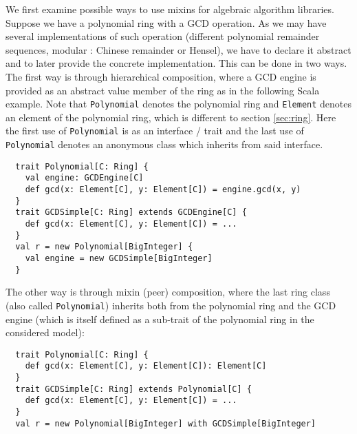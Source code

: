 \documentclass{llncs}
\newcommand{\code}[1]{\texttt{#1}}
\begin{document}
We first examine possible ways to use mixins for algebraic algorithm
libraries. Suppose we have a polynomial ring with a GCD operation. As
we may have several implementations of such operation (different
polynomial remainder sequences, modular : Chinese remainder or
Hensel), we have to declare it abstract and to later provide the
concrete implementation. This can be done in two ways. The first way
is through hierarchical composition, where a GCD engine is provided as
an abstract value member of the ring as in the following Scala
example. Note that \code{Polynomial} denotes the polynomial ring and
\code{Element} denotes an element of the polynomial ring, which is
different to section \ref{sec:ring}.
Here the first use of \code{Poly\-nomial} is as an interface / trait
and the last use of \code{Poly\-nomial} denotes an anonymous class
which inherits from said interface.
%
\begin{verbatim}
  trait Polynomial[C: Ring] {
    val engine: GCDEngine[C]
    def gcd(x: Element[C], y: Element[C]) = engine.gcd(x, y)
  }
  trait GCDSimple[C: Ring] extends GCDEngine[C] {
    def gcd(x: Element[C], y: Element[C]) = ...
  }
  val r = new Polynomial[BigInteger] {
    val engine = new GCDSimple[BigInteger]
  }
\end{verbatim}
%
The other way is through mixin (peer) composition, where the last
ring class (also called \code{Polynomial}) inherits both from the
polynomial ring and the GCD engine (which is itself defined as a
sub-trait of the polynomial ring in the considered model):
\begin{verbatim}
  trait Polynomial[C: Ring] {
    def gcd(x: Element[C], y: Element[C]): Element[C]
  }
  trait GCDSimple[C: Ring] extends Polynomial[C] {
    def gcd(x: Element[C], y: Element[C]) = ...
  }
  val r = new Polynomial[BigInteger] with GCDSimple[BigInteger]
\end{verbatim}
\end{document}
